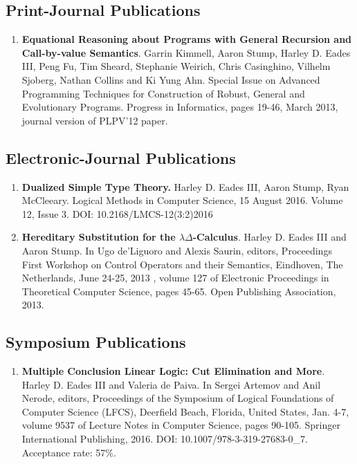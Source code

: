 \documentclass{article}
\begin{document}
  \subsection{Print-Journal Publications}
  \begin{enumerate}
  \item \textbf{Equational Reasoning about Programs with General Recursion and Call-by-value Semantics}.
  Garrin Kimmell, Aaron Stump, Harley D. Eades III, Peng Fu, Tim Sheard, Stephanie Weirich, 
  Chris Casinghino, Vilhelm Sjoberg, Nathan Collins and Ki Yung Ahn. 
  Special Issue on Advanced Programming Techniques for Construction of Robust, General and Evolutionary 
  Programs. Progress in Informatics, pages 19-46, March 2013, journal version of PLPV’12 paper. 
  \end{enumerate}

  \subsection{Electronic-Journal Publications}

  \begin{enumerate}
  \item \textbf{Dualized Simple Type Theory.} Harley D. Eades III, Aaron
    Stump, Ryan McCleeary. Logical Methods in Computer Science, 15
    August 2016. Volume 12, Issue 3. DOI: 10.2168/LMCS-12(3:2)2016

  \item \textbf{Hereditary Substitution for the
    $\lambda\Delta$-Calculus}.  Harley D. Eades III and Aaron Stump.
    In Ugo de'Liguoro and Alexis Saurin, editors, Proceedings First
    Workshop on Control Operators and their Semantics, Eindhoven, The
    Netherlands, June 24-25, 2013 , volume 127 of Electronic
    Proceedings in Theoretical Computer Science, pages 45-65. Open
    Publishing Association, 2013.

  \end{enumerate}

  \subsection{Symposium Publications}
  \label{subsec:symposium_publications}
  \begin{enumerate}
  \item \textbf{Multiple Conclusion Linear Logic: Cut Elimination and
    More}.  Harley D. Eades III and Valeria de Paiva. In Sergei Artemov
    and Anil Nerode, editors, Proceedings of the Symposium of Logical
    Foundations of Computer Science (LFCS), Deerfield Beach, Florida,
    United States, Jan. 4-7, volume 9537 of Lecture Notes in Computer
    Science, pages 90-105. Springer International Publishing,
    2016. DOI: 10.1007/978-3-319-27683-0\_7.  Acceptance rate: 57\%.
  \end{enumerate}
  
\end{document}
